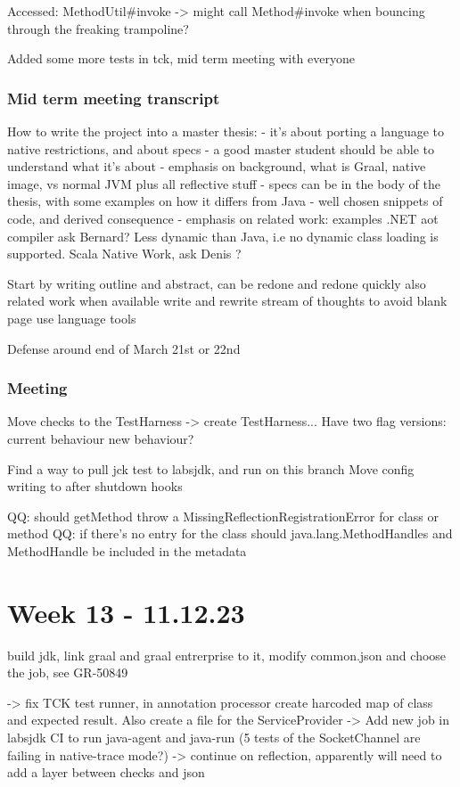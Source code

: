 Accessed:
MethodUtil\#invoke -> might call Method\#invoke when bouncing through the freaking trampoline?

Added some more tests in tck, mid term meeting with everyone

\subsubsection{Mid term meeting transcript}
How to write the project into a master thesis:
- it's about porting a language to native restrictions, and about specs
- a good master student should be able to understand what it's about
- emphasis on background, what is Graal, native image, vs normal JVM plus all reflective stuff
- specs can be in the body of the thesis, with some examples on how it differs from Java - well chosen snippets of code, and derived consequence
- emphasis on related work: examples .NET aot compiler ask Bernard? Less dynamic than Java, i.e no dynamic class loading is supported. Scala Native Work, ask Denis ?

Start by writing outline and abstract, can be redone and redone quickly
also related work when available
write and rewrite stream of thoughts to avoid blank page 
use language tools

Defense around end of March 21st or 22nd


\subsubsection{Meeting}
Move checks to the TestHarness -> create TestHarness...
Have two flag versions: current behaviour new behaviour?

Find a way to pull jck test to labsjdk, and run on this branch
Move config writing to after shutdown hooks

QQ: should getMethod throw a MissingReflectionRegistrationError for class or method QQ: if there's no entry for the class
should java.lang.MethodHandles and MethodHandle be included in the metadata

\section{Week 13 - 11.12.23}

build jdk, link graal and graal entrerprise to it, modify common.json and choose the job, see GR-50849

-> fix TCK test runner, in annotation processor create harcoded map of class and expected result. Also create a file for the ServiceProvider
-> Add new job in labsjdk CI to run java-agent and java-run (5 tests of the SocketChannel are failing in native-trace mode?)
-> continue on reflection, apparently will need to add a layer between checks and json

